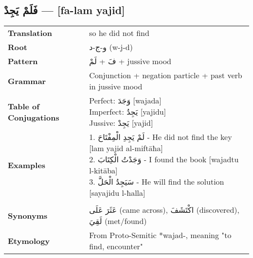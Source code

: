 \documentclass[letter,12pt]{article}
\begin{document}
\subsection{\textarabic{فَلَمْ يَجِدْ} — [fa-lam yajid]}
\begin{tabular}{p{3cm}p{10cm}}
\toprule

\textbf{Translation} & so he did not find \\
\textbf{Root} & \textarabic{و-ج-د} (w-j-d) \\
\textbf{Pattern} & \textarabic{فَ} + \textarabic{لَمْ} + jussive mood \\
\textbf{Grammar} & Conjunction + negation particle + past verb in jussive mood \\
\textbf{Table of Conjugations} & \makecell[l]{
Perfect: \textarabic{وَجَدَ} [wajada]\\
Imperfect: \textarabic{يَجِدُ} [yajidu]\\
Jussive: \textarabic{يَجِدْ} [yajid]
} \\
\textbf{Examples} & \makecell[l]{\parbox{9.5cm}{
1. \textarabic{لَمْ يَجِدِ الْمِفْتَاحَ} - He did not find the key [lam yajid al-miftāħa]\\
2. \textarabic{وَجَدْتُ الْكِتَابَ} - I found the book [wajadtu l-kitāba]\\
3. \textarabic{سَيَجِدُ الْحَلَّ} - He will find the solution [sayajidu l-ħalla]
}} \\
\midrule \\
\textbf{Synonyms} & \textarabic{عَثَرَ عَلَى} (came across), \textarabic{اكْتَشَفَ} (discovered), \textarabic{لَقِيَ} (met/found) \\
\textbf{Etymology} & From Proto-Semitic *wajad-, meaning "to find, encounter" \\
\bottomrule
\end{tabular}
\end{document}
